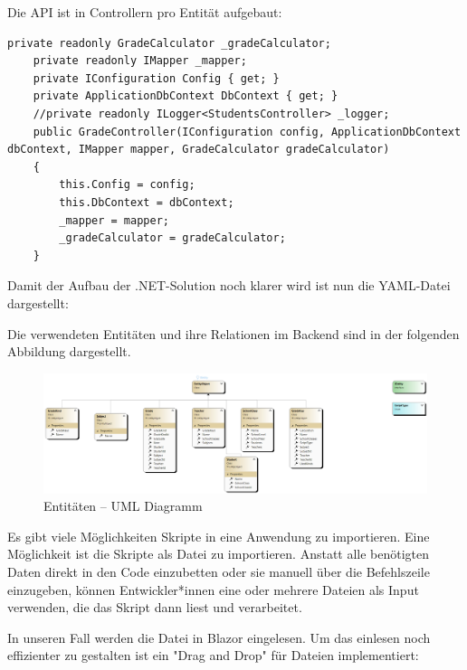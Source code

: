 \newpage

Die API ist in Controllern pro Entität aufgebaut:
\begin{lstlisting}[language={[Sharp]C}, caption=API - Controller, label=lst:imp:controller]
    private readonly GradeCalculator _gradeCalculator;
    private readonly IMapper _mapper;
    private IConfiguration Config { get; }
    private ApplicationDbContext DbContext { get; }
    //private readonly ILogger<StudentsController> _logger;
    public GradeController(IConfiguration config, ApplicationDbContext dbContext, IMapper mapper, GradeCalculator gradeCalculator) 
    {
        this.Config = config;
        this.DbContext = dbContext;
        _mapper = mapper;
        _gradeCalculator = gradeCalculator;       
    }
\end{lstlisting}

\newpage
Damit der Aufbau der .NET-Solution noch klarer wird ist nun die YAML-Datei dargestellt:


\newpage

Die verwendeten Entitäten und ihre Relationen im Backend sind in der folgenden Abbildung dargestellt.

\begin{figure}[H]
    \centering
    \includegraphics[scale=0.5]{pics/EntitiesClassDiagram.png}
    \caption{Entitäten -- UML Diagramm}
    \label{fig:impl:Entities}
\end{figure}




\newpage
Es gibt viele Möglichkeiten Skripte in eine Anwendung zu importieren.
Eine Möglichkeit ist die Skripte als Datei zu importieren.
Anstatt alle benötigten Daten direkt in den Code einzubetten oder sie manuell über die Befehlszeile einzugeben, 
können Entwickler*innen eine oder mehrere Dateien als Input verwenden, die das Skript dann liest und verarbeitet.

In unseren Fall werden die Datei in Blazor eingelesen.
Um das einlesen noch effizienter zu gestalten ist ein "Drag and Drop" für Dateien implementiert:


